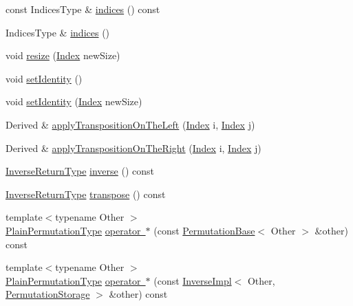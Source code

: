 \begin{DoxyCompactItemize}
const Indices\+Type \& \mbox{\hyperlink{class_eigen_1_1_permutation_base_adec727546b6882ecaa57e76d084951c5}{indices}} () const
\item 
Indices\+Type \& \mbox{\hyperlink{class_eigen_1_1_permutation_base_a16fa3afafdf703399d62c80f950802f1}{indices}} ()
\item 
void \mbox{\hyperlink{class_eigen_1_1_permutation_base_a0e0fda6e84d69e02432e4770359bb532}{resize}} (\mbox{\hyperlink{struct_eigen_1_1_eigen_base_a554f30542cc2316add4b1ea0a492ff02}{Index}} new\+Size)
\item 
void \mbox{\hyperlink{class_eigen_1_1_permutation_base_a6805bb75fd7966ea71895c24ff196444}{set\+Identity}} ()
\item 
void \mbox{\hyperlink{class_eigen_1_1_permutation_base_a830a80511a61634ef437795916f7f8da}{set\+Identity}} (\mbox{\hyperlink{struct_eigen_1_1_eigen_base_a554f30542cc2316add4b1ea0a492ff02}{Index}} new\+Size)
\item 
Derived \& \mbox{\hyperlink{class_eigen_1_1_permutation_base_a4e3455bf12b56123e38a8220c6b508dc}{apply\+Transposition\+On\+The\+Left}} (\mbox{\hyperlink{struct_eigen_1_1_eigen_base_a554f30542cc2316add4b1ea0a492ff02}{Index}} i, \mbox{\hyperlink{struct_eigen_1_1_eigen_base_a554f30542cc2316add4b1ea0a492ff02}{Index}} j)
\item 
Derived \& \mbox{\hyperlink{class_eigen_1_1_permutation_base_a5f98da0712570d0c4b12f61839ae4193}{apply\+Transposition\+On\+The\+Right}} (\mbox{\hyperlink{struct_eigen_1_1_eigen_base_a554f30542cc2316add4b1ea0a492ff02}{Index}} i, \mbox{\hyperlink{struct_eigen_1_1_eigen_base_a554f30542cc2316add4b1ea0a492ff02}{Index}} j)
\item 
\mbox{\hyperlink{class_eigen_1_1_inverse}{Inverse\+Return\+Type}} \mbox{\hyperlink{class_eigen_1_1_permutation_base_adb9af427f317202366c2832876064eb3}{inverse}} () const
\item 
\mbox{\hyperlink{class_eigen_1_1_inverse}{Inverse\+Return\+Type}} \mbox{\hyperlink{class_eigen_1_1_permutation_base_a05805e9f4182eec3f6632e1c765b5ffe}{transpose}} () const
\item 
{\footnotesize template$<$typename Other $>$ }\\\mbox{\hyperlink{class_eigen_1_1_permutation_matrix}{Plain\+Permutation\+Type}} \mbox{\hyperlink{class_eigen_1_1_permutation_base_a6081ae9241382cc27c32da6bb1786367}{operator $\ast$}} (const \mbox{\hyperlink{class_eigen_1_1_permutation_base}{Permutation\+Base}}$<$ Other $>$ \&other) const
\item 
{\footnotesize template$<$typename Other $>$ }\\\mbox{\hyperlink{class_eigen_1_1_permutation_matrix}{Plain\+Permutation\+Type}} \mbox{\hyperlink{class_eigen_1_1_permutation_base_a98b48bb723276fefd8ca7d7b14255ed4}{operator $\ast$}} (const \mbox{\hyperlink{class_eigen_1_1_inverse_impl}{Inverse\+Impl}}$<$ Other, \mbox{\hyperlink{struct_eigen_1_1_permutation_storage}{Permutation\+Storage}} $>$ \&other) const

\end{DoxyCompactItemize}
